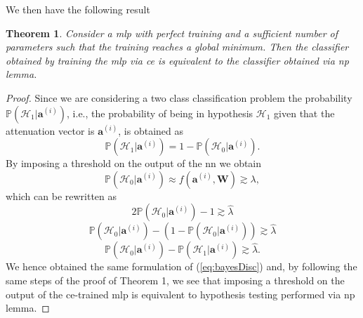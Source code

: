 \documentclass[draftcls,onecolumn,12pt]{IEEEtran}
\newtheorem{theorem}{Theorem}
\begin{document}
We then have the following result
\begin{theorem}
\label{th:nn_np2}
Consider a \ac{mlp} with perfect training and a sufficient number of parameters such that the training reaches a global minimum. Then the classifier obtained by training the \ac{mlp} via \ac{ce} is equivalent to the classifier obtained via \ac{np} lemma.
\end{theorem}
\begin{proof}
Since we are considering a two class classification problem the probability $\mathbb{P}(\mathcal{H}_1|\bm{a}^{(i)})$, i.e., the probability of being in hypothesis $\mathcal{H}_1$ given that the attenuation vector is $\bm{a}^{(i)}$, is obtained as
\begin{equation}
    \mathbb{P}(\mathcal{H}_1|\bm{a}^{(i)}) = 1- \mathbb{P}(\mathcal{H}_0|\bm{a}^{(i)}).
\end{equation}
By imposing a threshold on the output of the \ac{nn} we obtain
\begin{equation}
    \mathbb{P}(\mathcal{H}_0|\bm{a}^{(i)}) \approx  f(\bm{a}^{(i)},\bm{W}) \gtrsim \lambda,
\end{equation}
which can be rewritten as
\begin{equation}
    2\mathbb{P}(\mathcal{H}_0|\bm{a}^{(i)})-1 \gtrsim \hat{\lambda}
\end{equation}
\begin{equation}
    \mathbb{P}(\mathcal{H}_0|\bm{a}^{(i)})-(1-\mathbb{P}(\mathcal{H}_0|\bm{a}^{(i)})) \gtrsim \hat{\lambda}
\end{equation}
\begin{equation}
    \mathbb{P}(\mathcal{H}_0|\bm{a}^{(i)})-\mathbb{P}(\mathcal{H}_1|\bm{a}^{(i)}) \gtrsim \hat{\lambda}.
\end{equation}
We hence obtained the same formulation of (\ref{eq:bayesDisc}) and, by following the same steps of the proof of Theorem 1, we see that imposing a threshold on the output of the \ac{ce}-trained \ac{mlp} is equivalent to hypothesis testing performed via \ac{np} lemma.
\end{proof}
\end{document}
